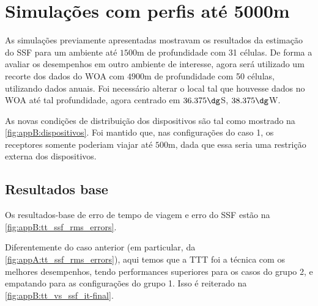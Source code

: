\def\sympathA{optimal-import-deep--petro--260518-10h30m42s--layer}
\def\sympathB{optimal-import-deep--petro--260518-10h30m45s--layer;blob}
\def\sympathC{optimal-import-deep--petro--260518-10h30m52s--layer;layer-diag}
\def\sympathD{optimal-import-deep--petro--260518-10h30m56s--layer;layer-column}
\def\sympathE{optimal-import-deep--petro--260518-10h31m03s--layer;bracket}
\def\sympathF{optimal-import-deep--petro--260518-10h31m12s--surround}
\def\sympathG{optimal-import-deep--petro--260518-10h31m24s--layer-scolumn;layer}
\def\sympathH{optimal-import-deep--petro--260518-10h31m31s--layer;layer-scolumn}
\def\sympathI{optimal-import-deep--petro--260518-10h31m36s--semi-surround}
\def\sympathJ{optimal-import-deep--petro--260518-10h31m45s--layer;cap}


\setcounter{const}{0}
\section{Simulações com perfis até 5000m}

As simulações previamente apresentadas mostravam os resultados da estimação do SSF para um ambiente até $1500\si{\meter}$ de profundidade com 31 células. De forma a avaliar os desempenhos em outro ambiente de interesse, agora será utilizado um recorte dos dados do WOA com $4900\si{\meter}$ de profundidade com 50 células, utilizando dados anuais. Foi necessário alterar o local tal que houvesse dados no WOA até tal profundidade, agora centrado em $36.375\dg$S, $38.375\dg$W.

As novas condições de distribuição dos dispositivos são tal como mostrado na \cref{fig:appB:dispositivos}. Foi mantido que, nas configurações do caso 1, os receptores somente poderiam viajar até $500\si{\meter}$, dada que essa seria uma restrição externa dos dispositivos.

\subsection{Resultados base}

Os resultados-base de erro de tempo de viagem e erro do SSF estão na \cref{fig:appB:tt_ssf_rms_errors}.

\const

Diferentemente do caso anterior (em particular, da \cref{fig:appA:tt_ssf_rms_errors}), aqui temos que a TTT foi a técnica com os melhores desempenhos, tendo performances superiores para os casos do grupo 2, e empatando para as configurações do grupo 1. Isso é reiterado na \cref{fig:appB:tt_vs_ssf_it-final}.







